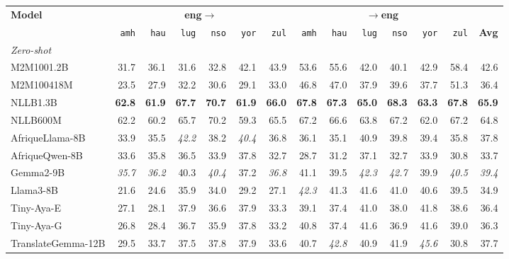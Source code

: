 \begin{table}[t]
\centering
\small
\renewcommand{\arraystretch}{1.05}
\begin{tabular}{lrrrrrrrrrrrrr}
\toprule
\textbf{Model} & \multicolumn{6}{c}{\textbf{eng$\to$}} & \multicolumn{6}{c}{\textbf{$\to$eng}} & \\
\cmidrule(lr){2-7}\cmidrule(lr){8-13}
   & \texttt{amh} & \texttt{hau} & \texttt{lug} & \texttt{nso} & \texttt{yor} & \texttt{zul} & \texttt{amh} & \texttt{hau} & \texttt{lug} & \texttt{nso} & \texttt{yor} & \texttt{zul} & \textbf{Avg} \\
\midrule
\multicolumn{14}{l}{\textit{Zero-shot}} \\
\midrule
M2M100\textunderscore{}1.2B & 31.7 & 36.1 & 31.6 & 32.8 & 42.1 & 43.9 & 53.6 & 55.6 & 42.0 & 40.1 & 42.9 & 58.4 & 42.6 \\
M2M100\textunderscore{}418M & 23.5 & 27.9 & 32.2 & 30.6 & 29.1 & 33.0 & 46.8 & 47.0 & 37.9 & 39.6 & 37.7 & 51.3 & 36.4 \\
NLLB\textunderscore{}1.3B & \textbf{62.8} & \textbf{61.9} & \textbf{67.7} & \textbf{70.7} & \textbf{61.9} & \textbf{66.0} & \textbf{67.8} & \textbf{67.3} & \textbf{65.0} & \textbf{68.3} & \textbf{63.3} & \textbf{67.8} & \textbf{65.9} \\
NLLB\textunderscore{}600M & 62.2 & 60.2 & 65.7 & 70.2 & 59.3 & 65.5 & 67.2 & 66.6 & 63.8 & 67.2 & 62.0 & 67.2 & 64.8 \\
\midrule
AfriqueLlama-8B & 33.9 & 35.5 & \emph{42.2} & 38.2 & \emph{40.4} & 36.8 & 36.1 & 35.1 & 40.9 & 39.8 & 39.4 & 35.8 & 37.8 \\
AfriqueQwen-8B & 33.6 & 35.8 & 36.5 & 33.9 & 37.8 & 32.7 & 28.7 & 31.2 & 37.1 & 32.7 & 33.9 & 30.8 & 33.7 \\
Gemma2-9B & \emph{35.7} & \emph{36.2} & 40.3 & \emph{40.4} & 37.2 & \emph{36.8} & 41.1 & 39.5 & \emph{42.3} & \emph{42.7} & 39.9 & \emph{40.5} & \emph{39.4} \\
Llama3-8B & 21.6 & 24.6 & 35.9 & 34.0 & 29.2 & 27.1 & \emph{42.3} & 41.3 & 41.6 & 41.0 & 40.6 & 39.5 & 34.9 \\
Tiny-Aya-E & 27.1 & 28.1 & 37.9 & 36.6 & 37.9 & 33.3 & 39.1 & 37.4 & 41.0 & 38.0 & 41.8 & 38.6 & 36.4 \\
Tiny-Aya-G & 26.8 & 28.4 & 36.7 & 35.9 & 37.8 & 33.2 & 40.8 & 37.4 & 41.6 & 36.9 & 41.6 & 39.0 & 36.3 \\
TranslateGemma-12B & 29.5 & 33.7 & 37.5 & 37.8 & 37.9 & 33.6 & 40.7 & \emph{42.8} & 40.9 & 41.9 & \emph{45.6} & 30.8 & 37.7 \\

\end{tabular}
\end{table}
